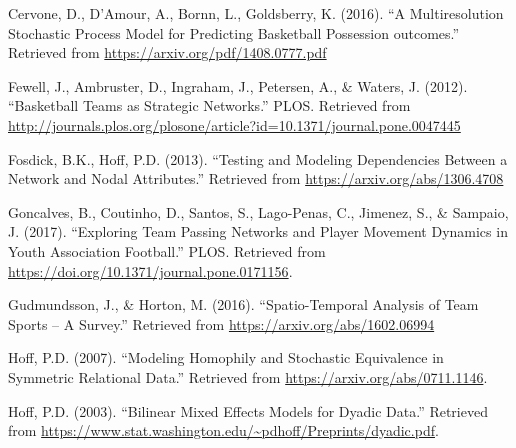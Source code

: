 \documentclass[12pt,twoside]{dukestatscithesis}
\theoremstyle{definition}
\theoremstyle{definition}
\theoremstyle{definition}
\theoremstyle{remark}
\begin{document}
Cervone, D., D'Amour, A., Bornn, L., Goldsberry, K. (2016). ``A
Multiresolution Stochastic Process Model for Predicting Basketball
Possession outcomes.'' Retrieved from
\url{https://arxiv.org/pdf/1408.0777.pdf}

Fewell, J., Ambruster, D., Ingraham, J., Petersen, A., \& Waters, J.
(2012). ``Basketball Teams as Strategic Networks.'' PLOS. Retrieved from
\url{http://journals.plos.org/plosone/article?id=10.1371/journal.pone.0047445}

Fosdick, B.K., Hoff, P.D. (2013). ``Testing and Modeling Dependencies
Between a Network and Nodal Attributes.'' Retrieved from
\url{https://arxiv.org/abs/1306.4708}

Goncalves, B., Coutinho, D., Santos, S., Lago-Penas, C., Jimenez, S., \&
Sampaio, J. (2017). ``Exploring Team Passing Networks and Player
Movement Dynamics in Youth Association Football.'' PLOS. Retrieved from
\url{https://doi.org/10.1371/journal.pone.0171156}.

Gudmundsson, J., \& Horton, M. (2016). ``Spatio-Temporal Analysis of
Team Sports -- A Survey.'' Retrieved from
\url{https://arxiv.org/abs/1602.06994}

Hoff, P.D. (2007). ``Modeling Homophily and Stochastic Equivalence in
Symmetric Relational Data.'' Retrieved from
\url{https://arxiv.org/abs/0711.1146}.

Hoff, P.D. (2003). ``Bilinear Mixed Effects Models for Dyadic Data.''
Retrieved from
\url{https://www.stat.washington.edu/~pdhoff/Preprints/dyadic.pdf}.


\noindent

\setlength{\parindent}{-0.20in} \setlength{\leftskip}{0.20in}
\setlength{\parskip}{8pt}


\end{document}
